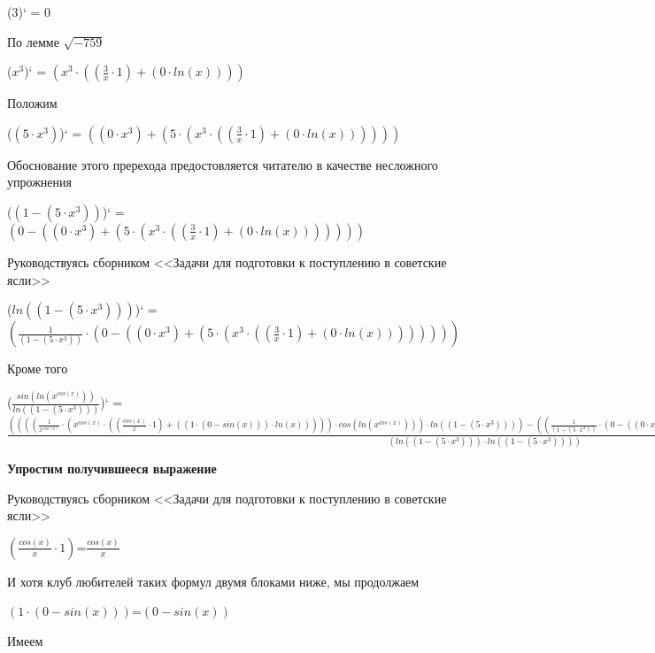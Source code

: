 \documentclass[12pt,a4paper,fleqn]{article}
\begin{document}
\begin{center}
($3$)`
 = $0$\end{center}
По лемме $\sqrt{-759}$
\begin{center}
($x^{3}$)`
 = $(x^{3} \cdot ((\frac{3}{x} \cdot 1) + (0 \cdot ln(x))))$\end{center}
Положим

\begin{center}
($(5 \cdot x^{3})$)`
 = $((0 \cdot x^{3}) + (5 \cdot (x^{3} \cdot ((\frac{3}{x} \cdot 1) + (0 \cdot ln(x))))))$\end{center}
Обоснование этого пререхода предостовляется читателю в качестве несложного упрожнения

\begin{center}
($(1 - (5 \cdot x^{3}))$)`
 = $(0 - ((0 \cdot x^{3}) + (5 \cdot (x^{3} \cdot ((\frac{3}{x} \cdot 1) + (0 \cdot ln(x)))))))$\end{center}
Руководствуясь сборником <<Задачи для подготовки к поступлению в советские ясли>>

\begin{center}
($ln((1 - (5 \cdot x^{3})))$)`
 = $(\frac{1}{(1 - (5 \cdot x^{3}))} \cdot (0 - ((0 \cdot x^{3}) + (5 \cdot (x^{3} \cdot ((\frac{3}{x} \cdot 1) + (0 \cdot ln(x))))))))$\end{center}
Кроме того

\begin{center}
($\frac{sin(ln(x^{cos(x)}))}{ln((1 - (5 \cdot x^{3})))}$)`
 = $\frac{((((\frac{1}{x^{cos(x)}} \cdot (x^{cos(x)} \cdot ((\frac{cos(x)}{x} \cdot 1) + ((1 \cdot (0 - sin(x))) \cdot ln(x))))) \cdot cos(ln(x^{cos(x)}))) \cdot ln((1 - (5 \cdot x^{3})))) - ((\frac{1}{(1 - (5 \cdot x^{3}))} \cdot (0 - ((0 \cdot x^{3}) + (5 \cdot (x^{3} \cdot ((\frac{3}{x} \cdot 1) + (0 \cdot ln(x)))))))) \cdot sin(ln(x^{cos(x)}))))}{(ln((1 - (5 \cdot x^{3}))) \cdot ln((1 - (5 \cdot x^{3}))))}$\end{center}
\newpage \textbf{\LARGE Упростим получившееся выражение}

Руководствуясь сборником <<Задачи для подготовки к поступлению в советские ясли>>

\begin{center}
$(\frac{cos(x)}{x} \cdot 1)$=$\frac{cos(x)}{x}$\end{center}
И хотя клуб любителей таких формул двумя блоками ниже, мы продолжаем

\begin{center}
$(1 \cdot (0 - sin(x)))$=$(0 - sin(x))$\end{center}
Имеем
\end{document}
